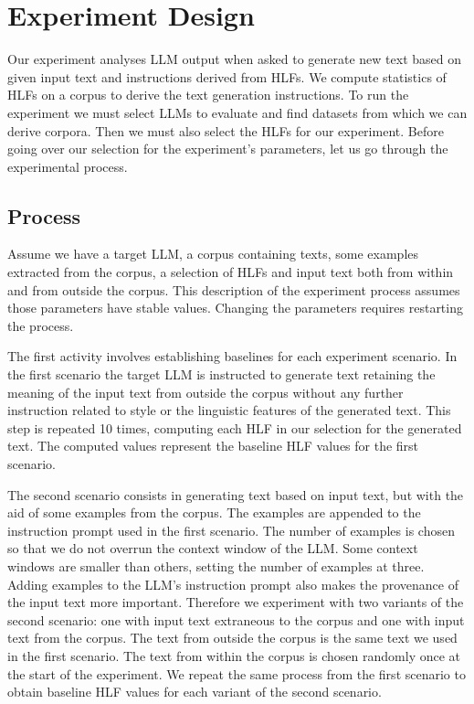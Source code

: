 \documentclass[11pt]{article}
\begin{document}
\section{Experiment Design}\label{method}

Our experiment analyses LLM output when asked to generate new text based on
given input text and instructions derived from HLFs.
We compute statistics of HLFs on a corpus to derive the text generation
instructions.
To run the experiment we must select LLMs to evaluate and find datasets from
which we can derive corpora.
Then we must also select the HLFs for our experiment.
Before going over our selection for the experiment's parameters, let us go
through the experimental process.

\subsection{Process}\label{subsec:experiment-process}

Assume we have a target LLM, a corpus containing texts, some examples extracted
from the corpus, a selection of HLFs and input text both from within and from
outside the corpus.
This description of the experiment process assumes those parameters have stable
values.
Changing the parameters requires restarting the process.

The first activity involves establishing baselines for each experiment scenario.
In the first scenario the target LLM is instructed to generate text retaining
the meaning of the input text from outside the corpus without any further
instruction related to style or the linguistic features of the generated text.
This step is repeated 10 times, computing each HLF in our selection for the
generated text.
The computed values represent the baseline HLF values for the first scenario.

The second scenario consists in generating text based on input text, but with
the aid of some examples from the corpus.
The examples are appended to the instruction prompt used in the first scenario.
The number of examples is chosen so that we do not overrun the context window of
the LLM.\@
Some context windows are smaller than others, setting the number of examples at
three.
Adding examples to the LLM's instruction prompt also makes the provenance of the
input text more important.
Therefore we experiment with two variants of the second scenario: one with input
text extraneous to the corpus and one with input text from the corpus.
The text from outside the corpus is the same text we used in the first scenario.
The text from within the corpus is chosen randomly once at the start of the
experiment.
We repeat the same process from the first scenario to obtain baseline HLF values
for each variant of the second scenario.
\end{document}
